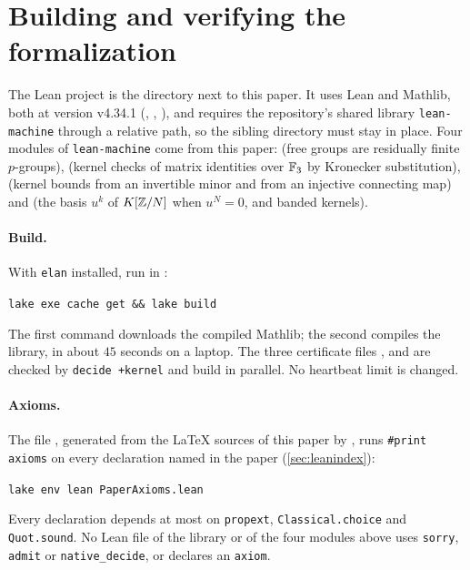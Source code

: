 \section{Building and verifying the formalization}\label{sec:verify}

The Lean project is the directory  next to this paper. It uses Lean and Mathlib, both at version v4.34.1
(, , ), and requires the repository's shared library
\texttt{lean-machine} through a relative path, so the sibling directory  must stay in place.
Four modules of \texttt{lean-machine} come from this paper:  (free groups are residually
finite $p$-groups),  (kernel checks of matrix identities over $\mathbb{F}_3$ by Kronecker
substitution),  (kernel bounds from an invertible minor and from an injective connecting
map) and  (the basis $u^k$ of $K[\mathbb{Z}/N]$ when $u^N=0$, and banded kernels).

\paragraph{Build.} With \texttt{elan} installed, run in :
\begin{center}
\texttt{lake exe cache get \&\& lake build}
\end{center}
The first command downloads the compiled Mathlib; the second compiles the library, in about $45$ seconds on a laptop.
The three certificate files ,  and  are checked by
\texttt{decide +kernel} and build in parallel. No heartbeat limit is changed.

\paragraph{Axioms.} The file , generated from the \LaTeX{} sources of this paper by
, runs \texttt{\#print axioms} on every declaration named in the paper (\cref{sec:leanindex}):
\begin{center}
\texttt{lake env lean PaperAxioms.lean}
\end{center}
Every declaration depends at most on \texttt{propext}, \texttt{Classical.choice} and \texttt{Quot.sound}. No Lean file of
the library or of the four modules above uses \texttt{sorry}, \texttt{admit} or \texttt{native\_decide}, or declares an
\texttt{axiom}.

